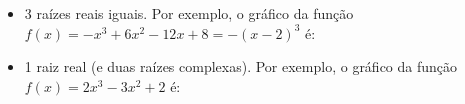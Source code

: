 \begin{itemize}
\begin{center}
\begin{tikzpicture}[scale=1]
    \end{tikzpicture}
\end{center}
 \item 3 raízes reais iguais. Por exemplo, o gráfico da função $f(x)= -x^3+6x^2-12x+8=-(x-2)^3$ é:
 \begin{center}
\end{center}
 \item 1 raiz real (e duas raízes complexas). Por exemplo, o gráfico da função $f(x)= 2x^3-3x^2+2$ é:
 \begin{center}
\end{center}
\end{itemize}





